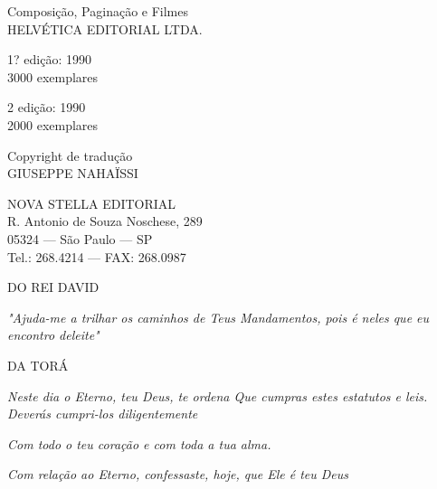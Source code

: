 Composição, Paginação e Filmes\\
HELVÉTICA EDITORIAL LTDA.

1? edição: 1990\\
3000 exemplares

2 edição: 1990\\
2000 exemplares

Copyright de tradução\\
GIUSEPPE NAHAÏSSI

NOVA STELLA EDITORIAL\\
R. Antonio de Souza Noschese, 289\\
05324 --- São Paulo --- SP\\
Tel.: 268.4214 --- FAX: 268.0987

DO REI DAVID

\emph{"Ajuda-me a trilhar os caminhos de Teus Man­damentos, pois é neles
que eu encontro deleite"}

DA TORÁ

\emph{Neste dia o Eterno, teu Deus, te ordena Que cumpras estes
estatutos e leis. Deverás cumpri-los diligentemente}

\emph{Com todo o teu coração e com toda a tua alma.}


\emph{Com relação ao Eterno, confessaste, hoje, que Ele é teu Deus}


